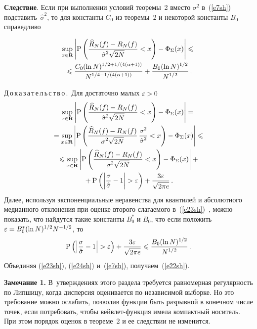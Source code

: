 \begin{multicols}{2}
\medskip

\noindent
\textbf{Следствие}. Если при выполнении условий теоремы~2 
вместо $\sigma^2$ в~(\ref{e7sh}) подставить~$\hat{\sigma}^2$, то для константы $C_0$ из теоремы~2 
и некоторой константы $B_0$ справедливо

\noindent
\begin{multline}
\sup\limits_{x\in\mathbf{R}}\left\vert\mbox{P}\left(
\displaystyle\frac{\displaystyle \widehat{R}_N(f)-R_N(f)\mathstrut}{\displaystyle \hat{\sigma}^2\sqrt{2N}\mathstrut}<x\right)-\Phi_\Sigma(x)\right\vert\leqslant{}\\
{}\leqslant
\displaystyle\frac{\displaystyle C_0(\ln N)^{{1}/{2}+{1}/(4(\alpha+1))}\mathstrut}{\displaystyle N^{{1}/{4}-{1}/(4(\alpha+1))}\mathstrut}+
\displaystyle\frac{\displaystyle B_0(\ln N)^{{1}/{2}}\mathstrut}{\displaystyle N^{{1}/{2}}\mathstrut}\,.\label{e22sh}
\end{multline}

\medskip

\noindent
Д\,о\,к\,а\,з\,а\,т\,е\,л\,ь\,с\,т\,в\,о\,.\
Для достаточно малых $\eps\hm>0$
\begin{multline}
\sup\limits_{x\in\mathbf{R}}\left\vert\mbox{P}\left(
\displaystyle\frac{\displaystyle \widehat{R}_N(f)-R_N(f)\mathstrut}{\displaystyle \hat{\sigma}^2\sqrt{2N}\mathstrut}<x\right)-\Phi_\Sigma(x)\right\vert={}\\
{}=
\sup\limits_{x\in\mathbf{R}}\left\vert\mbox{P}\left(
\displaystyle\frac{\displaystyle \widehat{R}_N(f)-R_N(f)\mathstrut}{\displaystyle \sigma^{2}\sqrt{2N}\mathstrut}\,
\displaystyle\frac{\displaystyle \sigma^{2}\mathstrut}{\displaystyle \hat{\sigma}^2\mathstrut}<x\right)-\Phi_\Sigma(x)\right\vert\leqslant{}\\
{}\leqslant\sup\limits_{x\in\mathbf{R}}\left\vert\mbox{P}\left(
\displaystyle\frac{\displaystyle \widehat{R}_N(f)-R_N(f)\mathstrut}{\displaystyle \sigma^{2}\sqrt{2N}\mathstrut}<x\right)-
\Phi_\Sigma(x)\right\vert+{}\\
{}+\mbox{P}\left(\left\vert\displaystyle\frac{\displaystyle \sigma\mathstrut}{\displaystyle \hat{\sigma}\mathstrut}-1\right\vert>\varepsilon\right)+
\displaystyle\frac{\displaystyle 3\varepsilon\mathstrut}{\displaystyle \sqrt{2\pi e}\mathstrut}\,.\label{e23sh}
\end{multline}
Далее, используя экспоненциальные неравенства для квантилей и абсолютного 
медианного отклонения при оценке второго слагаемого в~(\ref{e23sh})~\cite{12sh, 17sh}, 
можно показать, что найдутся такие константы $B^{*}_0$ и $B_0$, что если положить 
$\eps\hm=B^{*}_0(\ln N)^{{1}/{2}}N^{-{1}/{2}}$, то
\begin{equation}
\mbox{P}\left(\left\vert\frac{\sigma}{\hat{\sigma}}-1\right\vert>\varepsilon\right)+
\displaystyle\frac{\displaystyle 3\varepsilon\mathstrut}{\displaystyle \sqrt{2\pi e}\mathstrut}\leqslant\displaystyle\frac{\displaystyle B_0(\ln N)^{{1}/{2}}\mathstrut}{\displaystyle N^{{1}/{2}}\mathstrut}\,.\label{e24sh}
\end{equation}
Объединяя (\ref{e23sh}), (\ref{e24sh}) и~(\ref{e7sh}), получаем~(\ref{e22sh}).

\medskip

\noindent
\textbf{Замечание 1.} В~утверждениях этого раздела требуется равномерная 
регулярность по Липшицу, когда дисперсия оценивается по независимой выборке. 
Но это требование можно ослабить, позволив функции быть разрывной в конечном 
числе точек, если потребовать, чтобы вейвлет-функция имела компактный носитель. 
При этом порядок оценок в теореме~2 и ее следствии не изменится.


\end{multicols}
